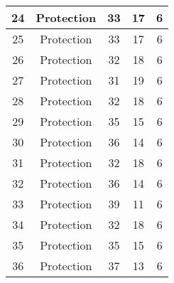 \documentclass[results.tex]{subfiles}
\begin{document}
\begin{center}
\begin{tabular}{| c || c | c | c | c |}
            \hline
            24                      & Protection                   & 33                     & 17                      & 6                    \\
            \hline
            25                      & Protection                   & 33                     & 17                      & 6                    \\
            \hline
            26                      & Protection                   & 32                     & 18                      & 6                    \\
            \hline
            27                      & Protection                   & 31                     & 19                      & 6                    \\
            \hline
            28                      & Protection                   & 32                     & 18                      & 6                    \\
            \hline
            29                      & Protection                   & 35                     & 15                      & 6                    \\
            \hline
            30                      & Protection                   & 36                     & 14                      & 6                    \\
            \hline
            31                      & Protection                   & 32                     & 18                      & 6                    \\
            \hline
            32                      & Protection                   & 36                     & 14                      & 6                    \\
            \hline
            33                      & Protection                   & 39                     & 11                      & 6                    \\
            \hline
            34                      & Protection                   & 32                     & 18                      & 6                    \\
            \hline
            35                      & Protection                   & 35                     & 15                      & 6                    \\
            \hline
            36                      & Protection                   & 37                     & 13                      & 6                    \\

\end{tabular}
\end{center}
\end{document}

